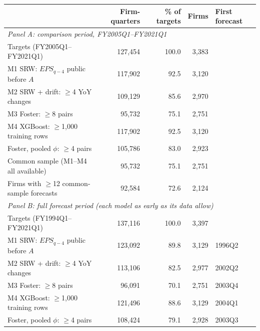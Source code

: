 \begin{tabular}{lrrrl}
\toprule
& Firm-quarters & \% of targets & Firms & First forecast \\
\midrule
\multicolumn{5}{l}{\emph{Panel A: comparison period, FY2005Q1--FY2021Q1}} \\
Targets (FY2005Q1--FY2021Q1) & 127,454 & 100.0 & 3,383 &  \\
M1 SRW: $EPS_{q-4}$ public before $A$ & 117,902 & 92.5 & 3,120 &  \\
M2 SRW + drift: $\geq$4 YoY changes & 109,129 & 85.6 & 2,970 &  \\
M3 Foster: $\geq$8 pairs & 95,732 & 75.1 & 2,751 &  \\
M4 XGBoost: $\geq$1,000 training rows & 117,902 & 92.5 & 3,120 &  \\
Foster, pooled $\phi$: $\geq$4 pairs & 105,786 & 83.0 & 2,923 &  \\
Common sample (M1--M4 all available) & 95,732 & 75.1 & 2,751 &  \\
Firms with $\geq$12 common-sample forecasts & 92,584 & 72.6 & 2,124 &  \\
\midrule
\multicolumn{5}{l}{\emph{Panel B: full forecast period (each model as early as its data allow)}} \\
Targets (FY1994Q1--FY2021Q1) & 137,116 & 100.0 & 3,397 &  \\
M1 SRW: $EPS_{q-4}$ public before $A$ & 123,092 & 89.8 & 3,129 & 1996Q2 \\
M2 SRW + drift: $\geq$4 YoY changes & 113,106 & 82.5 & 2,977 & 2002Q2 \\
M3 Foster: $\geq$8 pairs & 96,091 & 70.1 & 2,751 & 2003Q4 \\
M4 XGBoost: $\geq$1,000 training rows & 121,496 & 88.6 & 3,129 & 2004Q1 \\
Foster, pooled $\phi$: $\geq$4 pairs & 108,424 & 79.1 & 2,928 & 2003Q3 \\
\bottomrule
\end{tabular}
